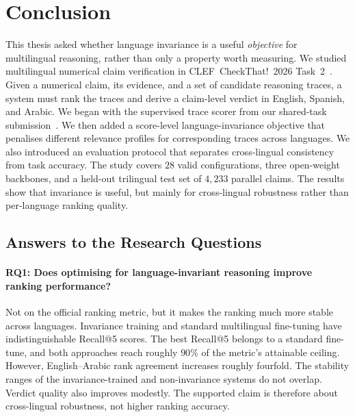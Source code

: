
\section{Conclusion}
\label{sec:conclusion}

This thesis asked whether language invariance is a useful \emph{objective} for multilingual reasoning,
rather than only a property worth measuring. We studied multilingual numerical claim verification in
CLEF~CheckThat!~2026 Task~2~\cite{clef-checkthat:2026:task2}. Given a numerical claim, its evidence,
and a set of candidate reasoning traces, a system must rank the traces and derive a claim-level
verdict in English, Spanish, and Arabic. We began with the supervised trace scorer from our
shared-task submission~\cite{khawaja2026gipplab}. We then added a score-level language-invariance
objective that penalises different relevance profiles for corresponding traces across languages. We
also introduced an evaluation protocol that separates cross-lingual consistency from task accuracy.
The study covers $28$ valid configurations, three open-weight backbones, and a held-out
trilingual test set of $4{,}233$ parallel claims. The results show that invariance is useful, but mainly for
cross-lingual robustness rather than per-language ranking quality.

\subsection{Answers to the Research Questions}
\label{subsec:concl-rqs}

\paragraph{RQ1: Does optimising for language-invariant reasoning improve ranking performance?}
Not on the official ranking metric, but it makes the ranking much more stable across languages.
Invariance training and standard multilingual fine-tuning have indistinguishable Recall@5 scores.
The best Recall@5 belongs to a standard fine-tune, and both approaches reach roughly $90\%$ of the
metric's attainable ceiling. However, English--Arabic rank agreement increases roughly fourfold. The
stability ranges of the invariance-trained and non-invariance systems do not overlap. Verdict quality
also improves modestly. The supported claim is therefore about cross-lingual robustness, not higher
ranking accuracy.

